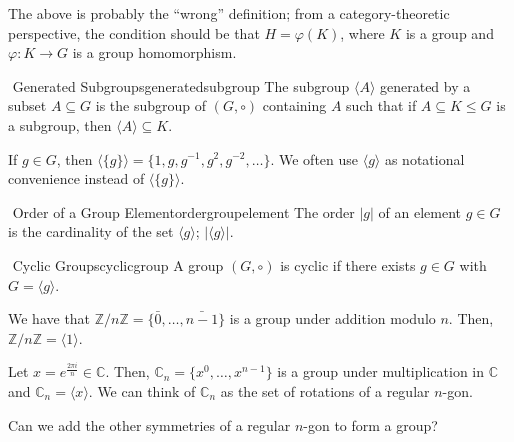         \begin{remark*}
            The above is probably the ``wrong'' definition; from a category-theoretic perspective, the condition should be that \(H=\varphi(K)\), where \(K\) is a group and \(\varphi:K\to G\) is a group homomorphism.
        \end{remark*}
        \begin{definition}{\Stop\,\,Generated Subgroups}{generatedsubgroup}
            The subgroup \(\langle A\rangle\) generated by a subset \(A\subseteq G\) is the subgroup of \((G,\circ)\) containing \(A\) such that if \(A\subseteq K\leq G\) is a subgroup, then \(\langle A\rangle\subseteq K\).
        \end{definition}
        \begin{example}
            If \(g\in G\), then \(\langle \{g\}\rangle=\{1,g,g^{-1},g^2,g^{-2},\ldots\}\). We often use \(\langle g\rangle\) as notational convenience instead of \(\langle\{g\}\rangle\).
        \end{example}
        \begin{definition}{\Stop\,\,Order of a Group Element}{ordergroupelement}
            The order \(|g|\) of an element \(g\in G\) is the cardinality of the set \(\langle g\rangle\); \(|\langle g\rangle|\).
        \end{definition}
        \begin{definition}{\Stop\,\,Cyclic Groups}{cyclicgroup}
            A group \((G,\circ)\) is cyclic if there exists \(g\in G\) with \(G=\langle g\rangle\).
        \end{definition}
        \begin{example}
            We have that \(\mathbb{Z}/n\mathbb{Z}=\{\bar{0},\ldots,\bar{n-1}\}\) is a group under addition modulo \(n\). Then, \(\mathbb{Z}/n\mathbb{Z}=\langle 1\rangle\).
        \end{example}
        \begin{example}
            Let \(x=e^{\frac{2\pi i}{n}}\in\mathbb{C}\). Then, \(\mathbb{C}_n=\{x^0,\ldots,x^{n-1}\}\) is a group under multiplication in \(\mathbb{C}\) and \(\mathbb{C}_n=\langle x\rangle\). We can think of \(\mathbb{C}_n\) as the set of rotations of a regular \(n\)-gon.
        \end{example}
        \begin{question*}
            Can we add the other symmetries of a regular \(n\)-gon to form a group?
        \end{question*}
        \vphantom
        \\
